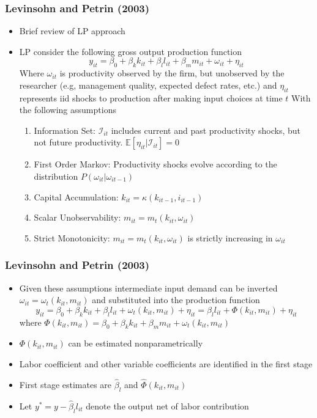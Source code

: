 \documentclass{beamer}
\begin{document}

\begin{frame}
\frametitle{Levinsohn and Petrin (2003)}
\begin{itemize}
	\item Brief review of LP approach	
	\item LP consider the following gross output production function
	\begin{equation}
	y_{it}=\beta_{0}+\beta_{k}k_{it}+\beta_{l}l_{it}+\beta_{m}m_{it}+\omega_{it}+\eta_{it}
	\end{equation}
	Where $\omega_{it}$ is productivity observed by the firm, but unobserved by the researcher (e.g, management quality, expected defect rates, etc.) and $\eta_{it}$ represents iid shocks to production after making input choices at time $t$
	With the following assumptions
	\medskip
	\begin{enumerate}
		\item Information Set: $\mathcal{I}_{it}$ includes current and past productivity shocks, but not future productivity. $\mathbb{E}[\eta_{it}|\mathcal{I}_{it}]=0$
		\item First Order Markov: Productivity shocks evolve according to the distribution $P(\omega_{it}|\omega_{it-1})$
		\item Capital Accumulation: $k_{it}=\kappa(k_{it-1}, i_{it-1})$
		\item Scalar Unobservability: $m_{it}=m_{t}(k_{it}, \omega_{it})$
		\item Strict Monotonicity: $m_{it}=m_{t}(k_{it}, \omega_{it})$ is strictly increasing in $\omega_{it}$
	\end{enumerate}
\end{itemize}
\end{frame}


\begin{frame}
\frametitle{Levinsohn and Petrin (2003)}
\begin{itemize}
	\item Given these assumptions intermediate input demand can be inverted $\omega_{it}=\omega_{t}(k_{it}, m_{it})$ and substituted into the production function
	\begin{equation}
		y_{it}=\beta_{0}+\beta_{k}k_{it}+\beta_{l}l_{it}+\omega_{t}(k_{it}, m_{it})+\eta_{it}=\beta_{l}l_{it}+\Phi(k_{it}, m_{it})+\eta_{it}
	\end{equation}
	where $\Phi(k_{it}, m_{it})=\beta_{0}+\beta_{k}k_{it}+\beta_{m}m_{it}+\omega_{t}(k_{it}, m_{it})$
	\item $\Phi(k_{it}, m_{it})$ can be estimated nonparametrically
	\item Labor coefficient and other variable coefficients are identified in the first stage
	\item First stage estimates are $\hat{\beta}_{l}$ and $\hat{\Phi}(k_{it}, m_{it})$ 
	\item Let $y^{*}=y-\hat{\beta}_{l}l_{it}$ denote the output net of labor contribution
\end{itemize}
\end{frame}
\end{document}
